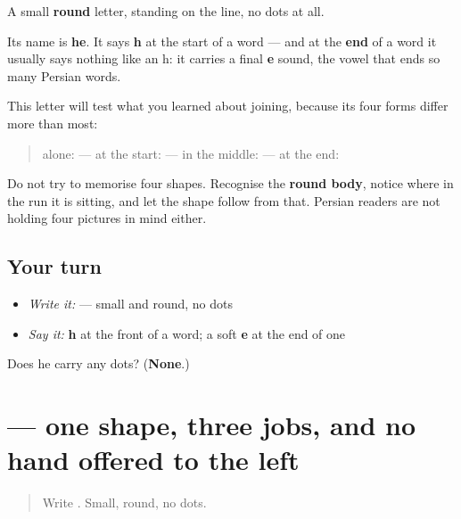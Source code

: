 \begin{quote}
\end{quote}

A small \textbf{round} letter, standing on the line, no dots at all.

Its name is \textbf{he}. It says \textbf{h} at the start of a word — and at the \textbf{end} of a word it usually says nothing like an h: it carries a final \textbf{e} sound, the vowel that ends so many Persian words.

This letter will test what you learned about joining, because its four forms differ more than most:

\begin{quote}
alone: \textbf{} — at the start: \textbf{} — in the middle: \textbf{} — at the end: \textbf{}
\end{quote}

Do not try to memorise four shapes. Recognise the \textbf{round body}, notice where in the run it is sitting, and let the shape follow from that. Persian readers are not holding four pictures in mind either.

\subsection*{Your turn}
\begin{itemize}
\raggedright
  \item \emph{Write it:}  — small and round, no dots
  \item \emph{Say it:} \textbf{h} at the front of a word; a soft \textbf{e} at the end of one
\end{itemize}

\begin{tcolorbox}[breakable,colback=teal!4,colframe=teal!35!black,title={Before you move on}]
Does he carry any dots? (\textbf{None}.)
\end{tcolorbox}
\section[\texorpdfstring{\fa{و} (vâv)}{و (vâv)}]{ — one shape, three jobs, and no hand offered to the left}

\label{lesson:FA-W15-vav}



\begin{quote}
Write . Small, round, no dots.
\end{quote}

